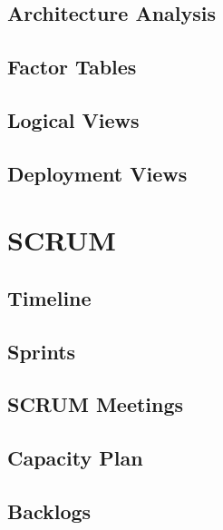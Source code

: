 \documentclass[a4paper,11pt]{article}
\begin{document}
\subsection{Architecture Analysis}


\subsection{Factor Tables}


\subsection{Logical Views}


\subsection{Deployment Views}


\pagebreak
\section{SCRUM}


\subsection{Timeline}


\subsection{Sprints}


\subsection{SCRUM Meetings}


\subsection{Capacity Plan}


\subsection{Backlogs}

\end{document}
